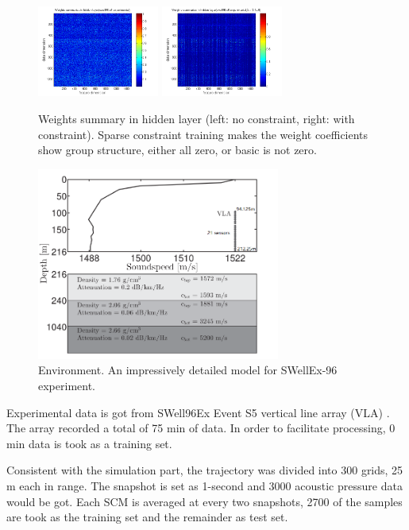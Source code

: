 \begin{figure}
\includegraphics[width=4cm,height=3cm]{figure/Weights_summaries_in_hidden_laye_swell_exp}
\includegraphics[width=4cm,height=3cm]{figure/Weights_summaries_in_hidden_layer_swell_exp_lambda_2_dot_1e_neg_5}
\caption{Weights summary in hidden layer (left: no constraint, right: with constraint). Sparse constraint
training makes the weight coefficients show group structure, either all zero, or basic is not zero.}
\end{figure}
\begin{figure}
\includegraphics[width=8cm]{figure/environment}
\caption{Environment. An impressively detailed model for SWellEx-96 experiment.}
\end{figure}
Experimental data is got from SWell96Ex Event S5 vertical line array (VLA) . The array recorded a total of 75 min of data. In order to facilitate processing, 0 min data is took as a training set.

Consistent with the simulation part, the trajectory was divided into 300 grids, 25 m each in range. The snapshot is set as 1-second and 3000 acoustic pressure data would be got. Each SCM is averaged at every two snapshots, 2700 of the samples are took as the training set and the remainder as test set.

